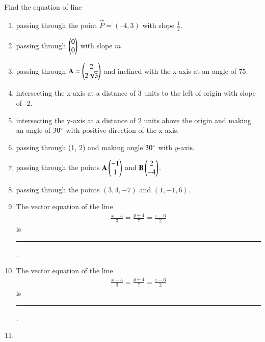 Find the equation of line 
\begin{enumerate}[label=\thesubsection.\arabic*, ref=\thesubsection.\theenumi]
	\item passing through the point $\vec{P} = (– 4,  3)$ with slope $\frac{1}{2}$.
\label{chapters/11/10/2/2}
\\
\solution

	\item passing through $\begin{pmatrix}0\\0\end{pmatrix}$ with slope $m$.\\
\label{chapters/11/10/2/3}
\solution

    \item passing through 
    $\mathbf{A} = \begin{pmatrix}2\\2\sqrt{3}\end{pmatrix}$ and inclined with the x-axis at an angle 
    of 75\textdegree.
\label{chapters/11/10/2/4}
\\
    \solution 

\item intersecting the x-axis at a distance of 3 units to the left of origin with slope of -2.
\label{chapters/11/10/2/5}
\\
\solution 

\item intersecting the y-axis at a distance of 2 units above the origin and making an
angle of $30\degree$ with positive direction of the x-axis.
\\
\solution 

\item passing through (1, 2) and making angle $30\degree$ with $y$-axis.
\item passing through the points $\mathbf{A}\begin{pmatrix}-1\\1\end{pmatrix}$ and $\mathbf{B}\begin{pmatrix}2\\-4\end{pmatrix}$.
\label{chapters/11/10/2/7}
\\
\solution 

\item passing through the points $(3, 4, -7)$ and $(1, -1, 6)$. 
\item The vector equation of the line 
\begin{align*}
	\frac{x-5}{3}=\frac{y+4}{7}=\frac{z-6}{2} 
\end{align*}
is \noindent\rule{2cm}{0.4pt}. 
\item The vector equation of the line 
\begin{align*}
	\frac{x-5}{3}=\frac{y+4}{7}=\frac{z-6}{2}
\end{align*}
 is \noindent\rule{2cm}{0.4pt}.
\item 

\end{enumerate}
